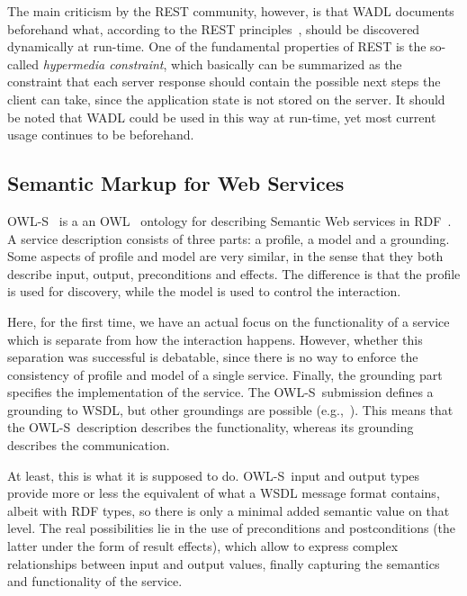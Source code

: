\documentclass[runningheads,a4paper, twocolumn]{llncs}
\newcommand{\owls}{\mbox{OWL-S}}
\begin{document}
The main criticism by the REST community, however, is that WADL documents beforehand what, according to the REST principles~\cite{FieldingREST}, should be discovered dynamically at run-time. One of the fundamental properties of REST is the so-called \emph{hypermedia constraint}, which basically can be summarized as the constraint that each server response should contain the possible next steps the client can take, since the application state is not stored on the server. It should be noted that WADL could be used in this way at run-time, yet most current usage continues to be beforehand.


\subsection{Semantic Markup for Web Services}

\owls~\cite{OWLS} is a an OWL~\cite{OWL} ontology for describing Semantic Web services in RDF~\cite{RDF}. A service description consists of three parts: a profile, a model and a grounding. Some aspects of profile and model are very similar, in the sense that they both describe input, output, preconditions and effects. The difference is that the profile is used for discovery, while the model is used to control the interaction.

Here, for the first time, we have an actual focus on the functionality of a service which is separate from how the interaction happens. However, whether this separation was successful is debatable, since there is no way to enforce the consistency of profile and model of a single service. Finally, the grounding part specifies the implementation of the service. The \owls\ submission defines a grounding to WSDL, but other groundings are possible (e.g.,~\cite{Verborgh:2010p2746}). This means that the \owls\ description describes the functionality, whereas its grounding describes the communication.

At least, this is what it is supposed to do. \owls\ input and output types provide more or less the equivalent of what a WSDL message format contains, albeit with RDF types, so there is only a minimal added semantic value on that level. The real possibilities lie in the use of preconditions and postconditions (the latter under the form of result effects), which allow to express complex relationships between input and output values, finally capturing the semantics and functionality of the service.
\end{document}

